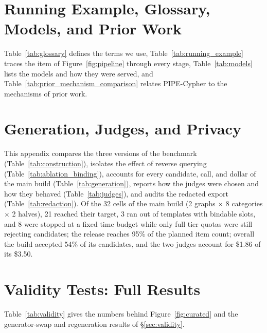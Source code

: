 \documentclass[11pt]{article}
\begin{document}


\clearpage
\appendix
\raggedbottom


\section{Running Example, Glossary, Models, and Prior Work}
Table~\ref{tab:glossary} defines the terms we use, Table~\ref{tab:running_example} traces the item of Figure~\ref{fig:pipeline} through every stage, Table~\ref{tab:models} lists the models and how they were served, and Table~\ref{tab:prior_mechanism_comparison} relates PIPE-Cypher to the mechanisms of prior work.



\clearpage


\section{Generation, Judges, and Privacy}
\label{app:judges}
This appendix compares the three versions of the benchmark (Table~\ref{tab:construction}), isolates the effect of reverse querying (Table~\ref{tab:ablation_binding}), accounts for every candidate, call, and dollar of the main build (Table~\ref{tab:generation}), reports how the judges were chosen and how they behaved (Table~\ref{tab:judges}), and audits the redacted export (Table~\ref{tab:redaction}). Of the 32 cells of the main build (2 graphs $\times$ 8 categories $\times$ 2 halves), 21 reached their target, 3 ran out of templates with bindable slots, and 8 were stopped at a fixed time budget while only full tier quotas were still rejecting candidates; the release reaches 95\% of the planned item count; overall the build accepted 54\% of its candidates, and the two judges account for \$1.86 of its \$3.50.












\section{Validity Tests: Full Results}
\label{app:validity}
Table~\ref{tab:validity} gives the numbers behind Figure~\ref{fig:curated} and the generator-swap and regeneration results of \S\ref{sec:validity}.

\end{document}
